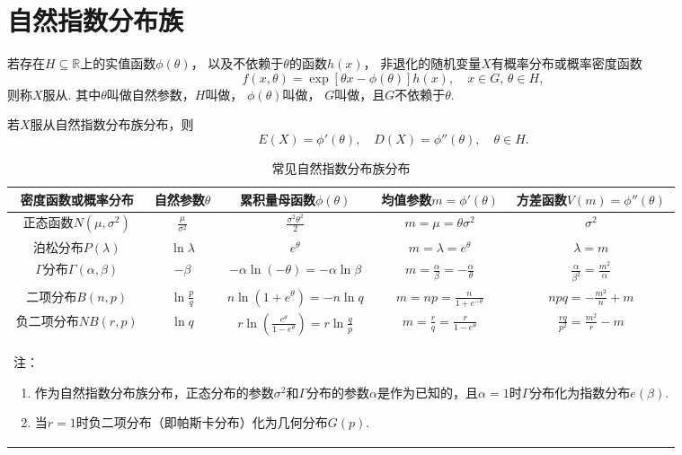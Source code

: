 \section{自然指数分布族}
\begin{definition}
若存在\(H \subseteq \mathbb{R}\)上的实值函数\(\phi(\theta)\)，
以及不依赖于\(\theta\)的函数\(h(x)\)，
非退化的随机变量\(X\)有概率分布或概率密度函数\[
f(x,\theta) = \exp[\theta x - \phi(\theta)] h(x),
\quad x \in G,\,\theta \in H,
\]则称\(X\)服从.
其中\(\theta\)叫做自然参数，\(H\)叫做，
\(\phi(\theta)\)叫做，
\(G\)叫做，且\(G\)不依赖于\(\theta\).
\end{definition}

\begin{theorem}
若\(X\)服从自然指数分布族分布，则\[
E(X) = \phi'(\theta),
\quad
D(X) = \phi''(\theta),
\quad
\theta \in H.
\]
\end{theorem}

\begin{landscape}
\begin{table}
\def\arraystretch{2.1}
\centering
\caption{常见自然指数分布族分布}
\begin{tabular}{|*{5}{c|}}
\hline
密度函数或概率分布 & 自然参数\(\theta\) & 累积量母函数\(\phi(\theta)\) & 均值参数\(m=\phi'(\theta)\) & 方差函数\(V(m) = \phi''(\theta)\) \\ \hline
正态函数\(N(\mu,\sigma^2)\) & \(\frac{\mu}{\sigma^2}\) & \(\frac{\sigma^2 \theta^2}{2}\) & \(m=\mu=\theta\sigma^2\) & \(\sigma^2\) \\ \hline
泊松分布\(P(\lambda)\) & \(\ln\lambda\) & \(e^{\theta}\) & \(m=\lambda=e^{\theta}\) & \(\lambda=m\) \\ \hline
\(\Gamma\)分布\(\Gamma(\alpha,\beta)\) & \(-\beta\) & \(-\alpha\ln(-\theta)=-\alpha\ln\beta\) & \(m=\frac{\alpha}{\beta}=-\frac{\alpha}{\theta}\) & \(\frac{\alpha}{\beta^2}=\frac{m^2}{\alpha}\) \\ \hline
二项分布\(B(n,p)\) & \(\ln\frac{p}{q}\) & \(n\ln(1+e^{\theta})=-n\ln{q}\) & \(m=np=\frac{n}{1+e^{-\theta}}\) & \(npq=-\frac{m^2}{n}+m\) \\ \hline
负二项分布\(NB(r,p)\) & \(\ln{q}\) & \(r\ln(\frac{e^{\theta}}{1-e^{\theta}})=r\ln\frac{q}{p}\) & \(m=\frac{r}{q}=\frac{r}{1-e^{\theta}}\) & \(\frac{rq}{p^2}=\frac{m^2}{r}-m\) \\ \hline
\multicolumn{5}{l}{%
\begin{minipage}{.7\paperwidth}
\vspace{1em}
注：\begin{enumerate}
\item 作为自然指数分布族分布，正态分布的参数\(\sigma^2\)和\(\Gamma\)分布的参数\(\alpha\)是作为已知的，且\(\alpha=1\)时\(\Gamma\)分布化为指数分布\(e(\beta)\).
\item 当\(r=1\)时负二项分布（即帕斯卡分布）化为几何分布\(G(p)\).
\end{enumerate}
\end{minipage}
} \\
\end{tabular}
\end{table}
\end{landscape}

